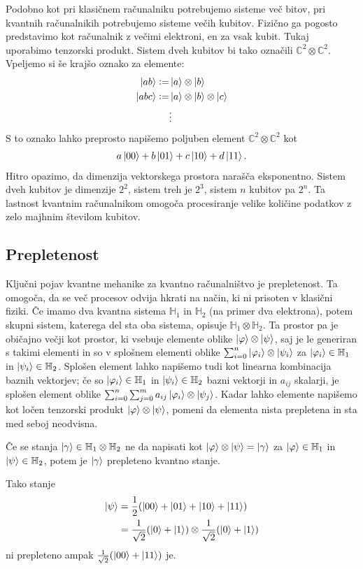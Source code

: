 \documentclass[mat1]{fmfdelo}
\newcommand{\Hb}{\mathbb H}
\renewcommand{\phi}{\varphi}
\newcommand{\defeq}{\vcentcolon=}
\begin{document}
Podobno kot pri klasičnem računalniku potrebujemo sisteme več bitov, pri kvantnih računalnikih potrebujemo sisteme večih kubitov. Fizično ga pogosto predstavimo kot računalnik z večimi elektroni, en za vsak kubit. Tukaj uporabimo tenzorski produkt. Sistem dveh kubitov bi tako označili \(\mathbb C^2 \otimes \mathbb C^2\). Vpeljemo si še krajšo oznako za elemente:
\begin{align*}
    \ket{ab} \defeq& \ket{a}\otimes\ket{b}\\
    \ket{abc} \defeq& \ket{a}\otimes\ket{b}\otimes\ket{c}\\
    &\vdots
\end{align*}
S to oznako lahko preprosto napišemo poljuben element \(\mathbb C^2 \otimes \mathbb C^2\) kot
\begin{align*}
    a\ket{00} + b\ket{01} + c\ket{10} + d\ket{11}.
\end{align*}
Hitro opazimo, da dimenzija vektorskega prostora narašča eksponentno. Sistem dveh kubitov je dimenzije \(2^2\), sistem treh je \(2^3\), sistem \(n\) kubitov pa \(2^n\). Ta lastnost kvantnim računalnikom omogoča procesiranje velike količine podatkov z zelo majhnim številom kubitov.
\subsection{Prepletenost}
Ključni pojav kvantne mehanike za kvantno računalništvo je prepletenost. Ta omogoča, da se več procesov odvija hkrati na način, ki ni prisoten v klasični fiziki. Če imamo dva kvantna sistema \(\Hb_1\) in \(\Hb_2\) (na primer dva elektrona), potem skupni sistem, katerega del sta oba sistema, opisuje \(\Hb_1\otimes\Hb_2\). Ta prostor pa je običajno večji kot prostor, ki vsebuje elemente oblike \(\ket\varphi\otimes\ket\psi\), saj je le generiran s takimi elementi in so v splošnem elementi oblike \(\sum_{i=0}^n\ket{\varphi_i}\otimes\ket{\psi_i}\) za \(\ket{\phi_i}\in\Hb_1\) in \(\ket{\psi_i}\in \Hb_2\). Splošen element lahko napišemo tudi kot linearna kombinacija baznih vektorjev; če so \(\ket{\phi_i}\in \Hb_1\) in \(\ket{\psi_i}\in\Hb_2\) bazni vektorji in \(a_{ij}\) skalarji, je splošen element oblike \(\sum_{i=0}^n\sum_{j=0}^m a_{ij}\ket{\phi_i}\otimes\ket{\psi_j}\). Kadar lahko elemente napišemo kot ločen tenzorski produkt \(\ket\varphi\otimes\ket\psi\), pomeni da elementa nista prepletena in sta med seboj neodvisna.
\begin{definicija}
    Če se stanja \(\ket\gamma\in \Hb_1\otimes\Hb_2\) ne da napisati kot \(\ket\varphi\otimes\ket\psi = \ket\gamma\) za \(\ket\varphi\in\Hb_1\) in \(\ket\psi\in\Hb_2\), potem je \(\ket\gamma\) prepleteno kvantno stanje.
\end{definicija}
Tako stanje
\begin{align*}
    \ket\psi &=  \frac12(\ket{00}+\ket{01}+\ket{10}+\ket{11})\\
    &= \frac{1}{\sqrt2}(\ket0+\ket1) \otimes \frac{1}{\sqrt2}(\ket0+\ket1) 
\end{align*}
ni prepleteno ampak \(\frac{1}{\sqrt2}(\ket{00}+\ket{11})\) je.
\end{document}
